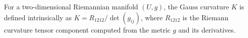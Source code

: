 For a two-dimensional Riemannian manifold $(U, g)$, the Gauss curvature $K$ is defined intrinsically as $K = R_{1212}/\det(g_{ij})$, where $R_{1212}$ is the Riemann curvature tensor component computed from the metric $g$ and its derivatives.